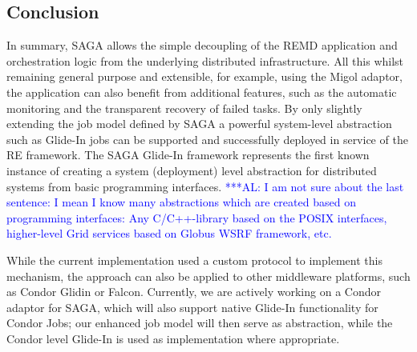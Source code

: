 \documentclass{rspublic}
\newcommand{\alnote}[1]{ {\textcolor{blue} { ***AL: #1 }}}
\newcommand{\alnote}[1]{}
\newcommand{\glidein}[1]{Glide-In }
\begin{document}
               
\subsection{Conclusion}
In summary, SAGA allows the simple decoupling of the REMD application
and orchestration logic from the underlying distributed
infrastructure. All this whilst remaining general purpose and
extensible, for example, using the Migol adaptor, the application can
also benefit from additional features, such as the automatic
monitoring and the transparent recovery of failed tasks. By only
slightly extending the job model defined by SAGA a powerful
system-level abstraction such as \glidein\ jobs can be supported
and successfully deployed in service of the RE framework. 
The SAGA \glidein\ framework represents the first known instance of creating a system
(deployment) level abstraction for distributed systems from basic programming interfaces.
\alnote{I am not sure about the last sentence: I mean I know many abstractions which
are created based on programming interfaces: Any C/C++-library based on the POSIX interfaces,
higher-level Grid services based on Globus WSRF framework, etc.}

While the current implementation used a custom protocol to implement this
mechanism, the approach can also be applied to other middleware
platforms, such as Condor Glidin or Falcon. Currently, we are actively
working on a Condor adaptor for SAGA, which will also support native
\glidein\ functionality for Condor Jobs; our enhanced job model 
will then serve as abstraction, while the Condor level 
\glidein\ is used as implementation where appropriate.
\end{document}
